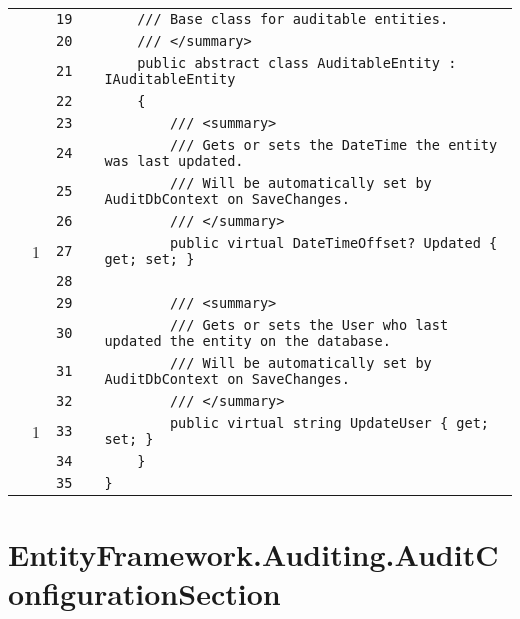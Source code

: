 \documentclass[a4paper,10pt]{article}
\begin{document}
\begin{longtable}[l]{lrrll}
\cellcolor{gray} &  & \verb~19~ & & \verb~    /// Base class for auditable entities.~\\
\cellcolor{gray} &  & \verb~20~ & & \verb~    /// </summary>~\\
\cellcolor{gray} &  & \verb~21~ & & \verb~    public abstract class AuditableEntity : IAuditableEntity~\\
\cellcolor{gray} &  & \verb~22~ & & \verb~    {~\\
\cellcolor{gray} &  & \verb~23~ & & \verb~        /// <summary>~\\
\cellcolor{gray} &  & \verb~24~ & & \verb~        /// Gets or sets the DateTime the entity was last updated.~\\
\cellcolor{gray} &  & \verb~25~ & & \verb~        /// Will be automatically set by AuditDbContext on SaveChanges.~\\
\cellcolor{gray} &  & \verb~26~ & & \verb~        /// </summary>~\\
\cellcolor{green} & 1 & \verb~27~ & & \verb~        public virtual DateTimeOffset? Updated { get; set; }~\\
\cellcolor{gray} &  & \verb~28~ & & \verb~~\\
\cellcolor{gray} &  & \verb~29~ & & \verb~        /// <summary>~\\
\cellcolor{gray} &  & \verb~30~ & & \verb~        /// Gets or sets the User who last updated the entity on the database.~\\
\cellcolor{gray} &  & \verb~31~ & & \verb~        /// Will be automatically set by AuditDbContext on SaveChanges.~\\
\cellcolor{gray} &  & \verb~32~ & & \verb~        /// </summary>~\\
\cellcolor{green} & 1 & \verb~33~ & & \verb~        public virtual string UpdateUser { get; set; }~\\
\cellcolor{gray} &  & \verb~34~ & & \verb~    }~\\
\cellcolor{gray} &  & \verb~35~ & & \verb~}~\\
\end{longtable}
\newpage
\section{EntityFramework.Auditing.AuditConfigurationSection}
\end{document}
